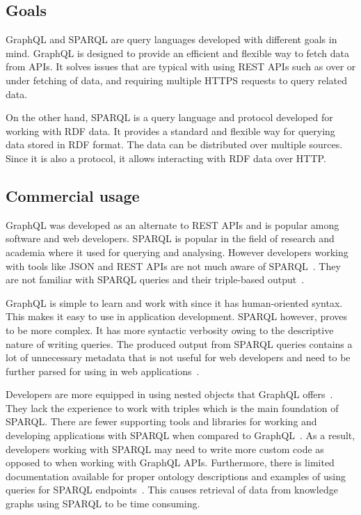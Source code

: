\subsection{Goals}
GraphQL and SPARQL are query languages developed with different goals in mind. GraphQL is designed to provide an efficient and flexible way to fetch data from APIs. It solves issues that are typical with using REST APIs such as over or under fetching of data, and requiring multiple HTTPS requests to query related data. 

On the other hand, SPARQL is a query language and protocol developed for working with RDF data. It provides a standard and flexible way for querying data stored in RDF format. The data can be distributed over multiple sources. Since it is also a protocol, it allows interacting with RDF data over HTTP. 
 
\subsection{Commercial usage}
GraphQL was developed as an alternate to REST APIs and is popular among software and web developers. 
SPARQL is popular in the field of research and academia where it used for querying and analysing. However developers working with tools like JSON and REST APIs are not much aware of SPARQL~\cite{Angele2022}. They are not familiar with SPARQL queries and their triple-based output~\cite{Angele2022}. 




GraphQL is simple to learn and work with since it has human-oriented syntax. This makes it easy to use in application development. SPARQL however, proves to be more complex. It has more syntactic verbosity owing to the descriptive nature of writing queries. The produced output from SPARQL queries contains a lot of unnecessary metadata that is not useful for web developers and need to be further parsed for using in web applications~\cite{Lisena2018}. 

Developers are more equipped in using nested objects that GraphQL offers~\cite{Taelman2018}. They lack the experience to work with triples which is the main foundation of SPARQL. There are fewer supporting tools and libraries for working and developing applications with SPARQL when compared to GraphQL~\cite{Taelman2018}. As a result, developers working with SPARQL may need to write more custom code as opposed to when working with GraphQL APIs. Furthermore, there is limited documentation available for proper ontology descriptions and examples of using queries for SPARQL endpoints~\cite{Angele2022}. This causes retrieval of data from knowledge graphs using SPARQL to be time consuming.

